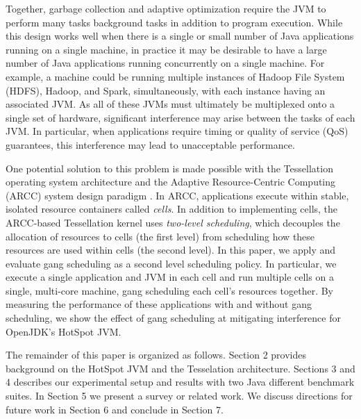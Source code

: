 \documentclass{sig-alternate}
\begin{document}



Together, garbage collection and adaptive optimization require the JVM to perform many tasks background tasks in addition to program execution. While this design works well when there is a single or small number of Java applications running on a single machine, in practice it may be desirable to have a large number of Java applications running concurrently on a single machine. For example, a machine could be running multiple instances of Hadoop File System (HDFS), Hadoop, and Spark, simultaneously, with each instance having an associated JVM. As all of these JVMs must ultimately be multiplexed onto a single set of hardware, significant interference may arise between the tasks of each JVM. In particular, when applications require timing or quality of service (QoS) guarantees, this interference may lead to unacceptable performance.

One potential solution to this problem is made possible with the Tessellation operating system architecture and the Adaptive Resource-Centric Computing (ARCC) system design paradigm \cite{colmenares2010resource, colmenares2013tessellation, liu2009tessellation}. In ARCC, applications execute within stable, isolated resource containers called \textit{cells}. In addition to implementing cells, the ARCC-based Tessellation kernel uses \textit{two-level scheduling}, which decouples the allocation of resources to cells (the first level) from scheduling how these resources are used within cells (the second level). In this paper, we apply and evaluate gang scheduling \cite{feitelson1992gang} as a second level scheduling policy. In particular, we execute a single application and JVM in each cell and run multiple cells on a single, multi-core machine, gang scheduling each cell's resources together. By measuring the performance of these applications with and without gang scheduling, we show the effect of gang scheduling at mitigating interference for OpenJDK's HotSpot JVM.

The remainder of this paper is organized as follows. Section 2 provides background on the HotSpot JVM and the Tesselation architecture. Sections 3 and 4 describes our experimental setup and results with two Java different benchmark suites. In Section 5 we present a survey or related work. We discuss directions for future work in Section 6 and conclude in Section 7.
\end{document}

